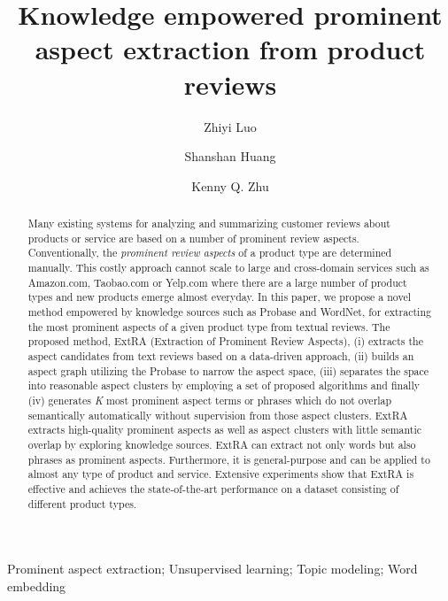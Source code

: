 \documentclass[preprint, 10pt]{elsarticle}
\begin{document}
\begin{frontmatter}

\title{Knowledge empowered prominent aspect extraction from
	product reviews}

\author{Zhiyi Luo}
\author{Shanshan Huang} 
\author{Kenny Q. Zhu}
\address[mymainaddress]{Department of Computer Science and Engineering, Shanghai Jiao Tong University}
\address[mysecondaryaddress]{ 800 Dongchuan Road, Shanghai, China 200240}

\begin{abstract}
	Many existing systems for analyzing and summarizing customer reviews about 
	products or service are based on a number of prominent review aspects. 
	Conventionally, the {\em prominent review aspects} of a product type 
	are determined manually. This costly approach cannot scale to large and 
	cross-domain services such as Amazon.com, Taobao.com or Yelp.com where 
	there are a large number of product types and
	new products emerge almost everyday. 
	In this paper, we propose a novel method empowered by
	knowledge sources such as
	Probase and WordNet, 
	for extracting the 
	most prominent aspects of a given product type  from textual reviews. 
	The proposed method, 
	ExtRA (Extraction of Prominent Review Aspects), 
	(i) extracts the aspect candidates from text reviews based on a
	data-driven approach,
	(ii) builds an aspect graph utilizing the Probase to narrow the aspect space, 
	(iii) separates the space into reasonable aspect clusters by employing a set of	proposed algorithms and finally
	(iv) generates \emph{K} most prominent aspect terms 
	or phrases which do not overlap semantically automatically without supervision from those aspect clusters.
	ExtRA extracts high-quality prominent aspects as well as aspect clusters with little semantic overlap by exploring knowledge sources.
	ExtRA can extract not only words but also phrases as prominent aspects.
	Furthermore, it is general-purpose and can be applied to 
	almost any type of product and service. 
	Extensive experiments show that ExtRA is effective and achieves 
	the state-of-the-art performance on a dataset consisting of 
	different product types.
\end{abstract}

\begin{keyword}Prominent aspect extraction; Unsupervised learning; Topic modeling; Word embedding
\end{keyword}

\end{frontmatter}
\end{document}
